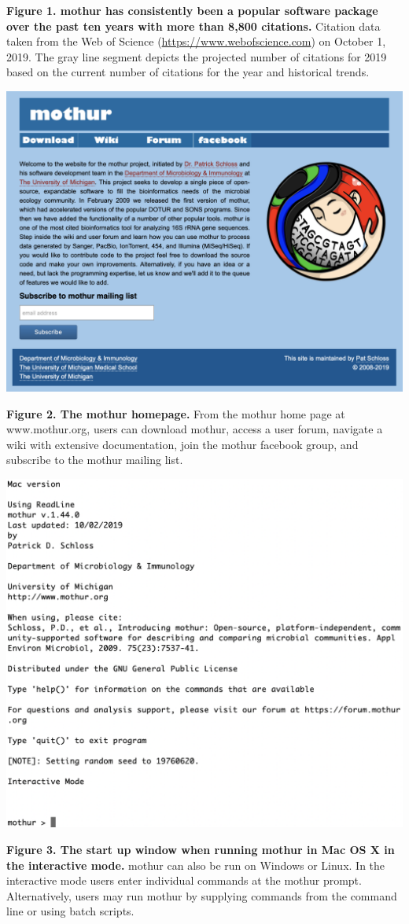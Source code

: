 \documentclass[11pt,]{article}
\begin{document}
\textbf{Figure 1. mothur has consistently been a popular software
package over the past ten years with more than 8,800 citations.}
Citation data taken from the Web of Science
(\url{https://www.webofscience.com}) on October 1, 2019. The gray line
segment depicts the projected number of citations for 2019 based on the
current number of citations for the year and historical trends.

\newpage

\includegraphics{figure_2.png}

\textbf{Figure 2. The mothur homepage.} From the mothur home page at
www.mothur.org, users can download mothur, access a user forum, navigate
a wiki with extensive documentation, join the mothur facebook group, and
subscribe to the mothur mailing list.

\newpage

\includegraphics{figure_3.png}

\textbf{Figure 3. The start up window when running mothur in Mac OS X in
the interactive mode.} mothur can also be run on Windows or Linux. In
the interactive mode users enter individual commands at the mothur
prompt. Alternatively, users may run mothur by supplying commands from
the command line or using batch scripts.
\end{document}
